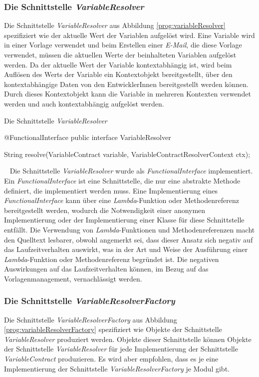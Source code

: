\subsubsection{Die Schnittstelle \emph{VariableResolver}}
\label{sec:variableResolver}
Die Schnittstelle \emph{VariableResolver} aus Abbildung \ref{prog:variableResolver} spezifiziert wie der aktuelle Wert der Variablen aufgelöst wird. Eine Variable wird in einer Vorlage verwendet und beim Erstellen einer \emph{E-Mail}, die diese Vorlage verwendet, müssen die aktuellen Werte der beinhalteten Variablen aufgelöst werden. Da der aktuelle Wert der Variable kontextabhängig ist, wird beim Auflösen des Werts der Variable ein Kontextobjekt bereitgestellt, über den kontextabhängige Daten von den  EntwicklerInnen bereitgestellt werden können. Durch dieses Kontextobjekt kann die Variable in mehreren Kontexten verwendet werden und auch kontextabhängig aufgelöst werden.
\begin{program}[h]
\caption{Die Schnittstelle \emph{VariableResolver}}
\label{prog:variableResolver}
\begin{JavaCode}
@FunctionalInterface
public interface VariableResolver {

    String resolve(VariableContract variable,
                   VariableContractResolverContext ctx);
}
\end{JavaCode}
\end{program}
\ \newline
Die Schnittstelle \emph{VariableResolver} wurde als \emph{FunctionalInterface} implementiert. Ein \emph{FunctionalInterface} ist eine Schnittstelle, die nur eine abstrakte Methode definiert, die implementiert werden muss. Eine Implementierung eines \emph{FunctionalInterface} kann über eine \emph{Lambda}-Funktion oder Methodenreferenz bereitgestellt werden, wodurch die Notwendigkeit einer anonymen Implementierung oder der Implementierung einer Klasse für diese Schnittstelle entfällt. Die Verwendung von \emph{Lambda}-Funktionen und Methodenreferenzen macht den Quelltext lesbarer, obwohl angemerkt sei, dass dieser Ansatz sich negativ auf das Laufzeitverhalten auswirkt, was in der Art und Weise der Ausführung einer \emph{Lambda}-Funktion oder Methodenreferenz begründet ist. Die negativen Auswirkungen auf das Laufzeitverhalten können, im Bezug auf das Vorlagenmanagement, vernachlässigt werden.

\subsubsection{Die Schnittstelle \emph{VariableResolverFactory}}
\label{sec:variableResolverFactory}
Die Schnittstelle \emph{VariableResolverFactory} aus Abbildung \ref{prog:variableResolverFactory}  spezifiziert wie Objekte der Schnittstelle \emph{VariableResolver} produziert werden. Objekte dieser Schnittstelle können Objekte der Schnittstelle \emph{VariableResolver} für jede Implementierung der Schnittstelle \emph{VariableContract} produzieren. Es wird aber empfohlen, dass es je eine Implementierung der Schnittstelle \emph{VariableResolverFactory} je Modul gibt.


